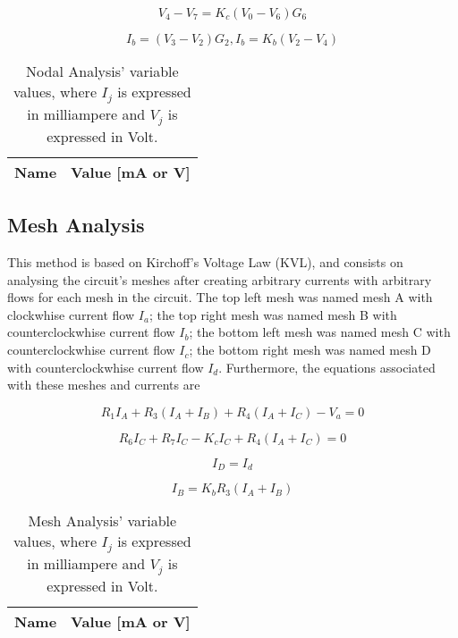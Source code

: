 \begin{equation}
  V_4 - V_7 = K_c(V_0 - V_6)G_6
  \label{eq:kvl7}
\end{equation}

\begin{equation}
  I_b = (V_3 - V_2)G_2 , I_b = K_b(V_2 - V_4)
  \label{eq:kvl8}
\end{equation}

\begin{table}[h]
  \centering
  \begin{tabular}{|l|r|}
    \hline    
    {\bf Name} & {\bf Value [mA or V]} \\ \hline
    
  \end{tabular}
  \caption{Nodal Analysis' variable values, where $I_j$ is expressed in milliampere and $V_j$ is expressed in Volt.}
  \label{tab:Nodal}
\end{table}
\FloatBarrier

\subsection{Mesh Analysis}

This method is based on Kirchoff's Voltage Law (KVL), and consists on analysing the circuit's meshes
after creating arbitrary currents with arbitrary flows for each mesh in the circuit. The top left mesh
was named mesh A with clockwhise current flow $I_a$; the top right mesh was named mesh B with counterclockwhise
current flow $I_b$; the bottom left mesh was named mesh C with counterclockwhise current flow $I_c$; the bottom right
mesh was named mesh D with counterclockwhise current flow $I_d$. Furthermore, the equations associated with these meshes
and currents are

\begin{equation}
  R_1 I_A + R_3(I_A + I_B) + R_4(I_A + I_C) - V_a = 0
  \label{eq:kvl}
\end{equation}

\begin{equation}
R_6 I_C + R_7 I_C - K_c I_C + R_4(I_A + I_C) = 0
  \label{eq:kvl2}
\end{equation}

\begin{equation}
  I_D = I_d
  \label{eq:kvl3}
\end{equation}

\begin{equation}
  I_B = K_b R_3(I_A + I_B)
  \label{eq:kvl4}
\end{equation}

\begin{table}[h]
  \centering
  \begin{tabular}{|l|r|}
    \hline    
    {\bf Name} & {\bf Value [mA or V]} \\ \hline
    
  \end{tabular}
  \caption{Mesh Analysis' variable values, where $I_j$ is expressed in milliampere and $V_j$ is expressed in Volt.}
  \label{tab:Mesh}
\end{table}
\FloatBarrier

